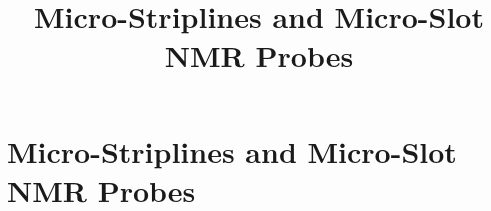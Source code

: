 \documentclass[]{book}
\title{Micro-Striplines and Micro-Slot NMR Probes}
\begin{document}
	\maketitle

	\chapter{Micro-Striplines and Micro-Slot NMR Probes}
	
	
	
	
	
	
	
	
	
\end{document}

